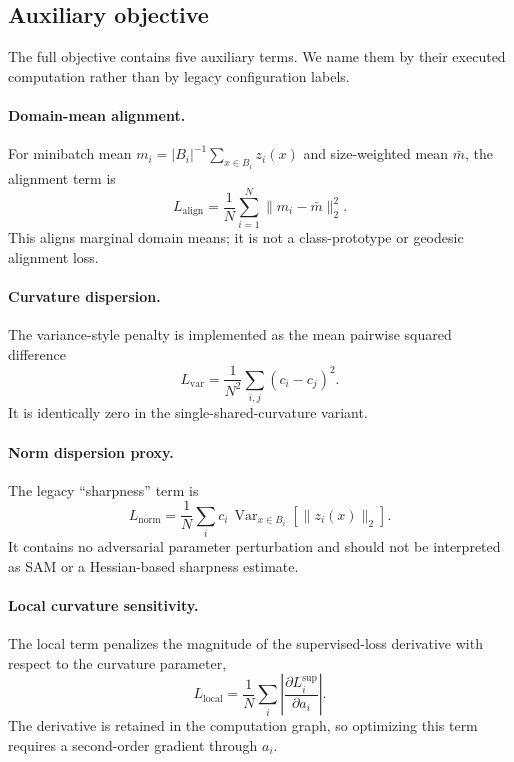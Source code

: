\documentclass[10pt]{article}
\begin{document}
\subsection{Auxiliary objective}

The full objective contains five auxiliary terms. We name them by their
executed computation rather than by legacy configuration labels.

\paragraph{Domain-mean alignment.}
For minibatch mean $m_i=|B_i|^{-1}\sum_{x\in B_i}z_i(x)$ and size-weighted
mean $\bar m$, the alignment term is
\begin{equation}
    L_{\mathrm{align}}=\frac{1}{N}\sum_{i=1}^N
    \|m_i-\bar m\|_2^2.
\end{equation}
This aligns marginal domain means; it is not a class-prototype or geodesic
alignment loss.

\paragraph{Curvature dispersion.}
The variance-style penalty is implemented as the mean pairwise squared
difference
\begin{equation}
    L_{\mathrm{var}}=\frac{1}{N^2}\sum_{i,j}(c_i-c_j)^2.
    \label{eq:variance}
\end{equation}
It is identically zero in the single-shared-curvature variant.

\paragraph{Norm dispersion proxy.}
The legacy ``sharpness'' term is
\begin{equation}
    L_{\mathrm{norm}}=\frac{1}{N}\sum_i c_i\,
    \operatorname{Var}_{x\in B_i}\!\left[\|z_i(x)\|_2\right].
\end{equation}
It contains no adversarial parameter perturbation and should not be interpreted
as SAM or a Hessian-based sharpness estimate.

\paragraph{Local curvature sensitivity.}
The local term penalizes the magnitude of the supervised-loss derivative with
respect to the curvature parameter,
\begin{equation}
    L_{\mathrm{local}}=\frac{1}{N}\sum_i
    \left|\frac{\partial L_i^{\mathrm{sup}}}{\partial a_i}\right|.
\end{equation}
The derivative is retained in the computation graph, so optimizing this term
requires a second-order gradient through $a_i$.
\end{document}
